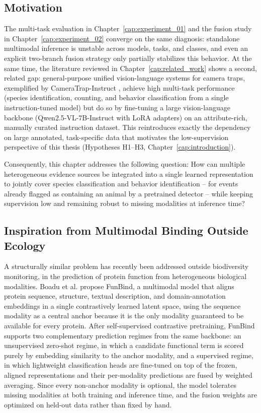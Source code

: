 \subsection{Motivation}

The multi-task evaluation in Chapter~\ref{cap:experiment_01} and the fusion study in Chapter~\ref{cap:experiment_02} converge on the same diagnosis: standalone multimodal inference is unstable across models, tasks, and classes, and even an explicit two-branch fusion strategy only partially stabilizes this behavior. At the same time, the literature reviewed in Chapter~\ref{cap:related_work} shows a second, related gap: general-purpose unified vision-language systems for camera traps, exemplified by CameraTrap-Instruct \citep{chen2026cameratrap}, achieve high multi-task performance (species identification, counting, and behavior classification from a single instruction-tuned model) but do so by fine-tuning a large vision-language backbone (Qwen2.5-VL-7B-Instruct with LoRA adapters) on an attribute-rich, manually curated instruction dataset. This reintroduces exactly the dependency on large annotated, task-specific data that motivates the low-supervision perspective of this thesis (Hypotheses H1--H3, Chapter~\ref{cap:introduction}).

Consequently, this chapter addresses the following question: How can multiple heterogeneous evidence sources be integrated into a single learned representation to jointly cover species classification and behavior identification -- for events already flagged as containing an animal by a pretrained detector -- while keeping supervision low and remaining robust to missing modalities at inference time?

\subsection{Inspiration from Multimodal Binding Outside Ecology}

A structurally similar problem has recently been addressed outside biodiversity monitoring, in the prediction of protein function from heterogeneous biological modalities. Boadu et al. \citep{boadu2026funbind} propose FunBind, a multimodal model that aligns protein sequence, structure, textual description, and domain-annotation embeddings in a single contrastively learned latent space, using the sequence modality as a central anchor because it is the only modality guaranteed to be available for every protein. After self-supervised contrastive pretraining, FunBind supports two complementary prediction regimes from the same backbone: an unsupervised zero-shot regime, in which a candidate functional term is scored purely by embedding similarity to the anchor modality, and a supervised regime, in which lightweight classification heads are fine-tuned on top of the frozen, aligned representations and their per-modality predictions are fused by weighted averaging. Since every non-anchor modality is optional, the model tolerates missing modalities at both training and inference time, and the fusion weights are optimized on held-out data rather than fixed by hand.

